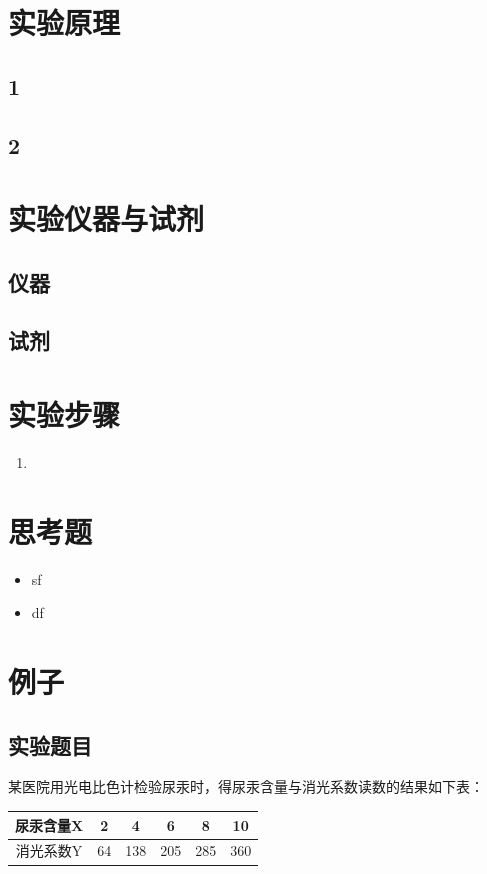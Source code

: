 \documentclass[UTF8,12pt,a4paper]{article}
\begin{document}
\section{实验原理}
\subsection{1}
\subsection{2}

\section{实验仪器与试剂}
\subsection{仪器}
\subsection{试剂}

\section{实验步骤}
\begin{enumerate}
	\item 
\end{enumerate}

\section{思考题}
\begin{itemize}
	\item sf
	\item df
\end{itemize}

\section{例子}
\subsection{实验题目}
某医院用光电比色计检验尿汞时，得尿汞含量与消光系数读数的结果如下表：
\begin{table}[!h]
	\centering
	\begin{tabular}{cccccc}
		\toprule
		尿汞含量X & 2     & 4     & 6     & 8     & 10 \\
		\midrule
		消光系数Y & 64    & 138   & 205   & 285   & 360 \\
		\bottomrule
	\end{tabular}%
	\label{tab:exercise8_3}%
\end{table}%
\end{document}
